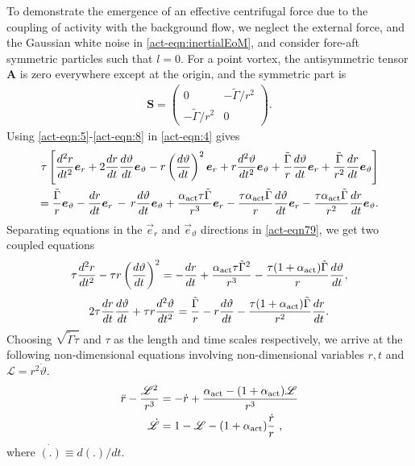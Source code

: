 \documentclass[../Rajarshi-thesis-draft.tex]{subfiles}
\begin{document}
To demonstrate the emergence of an effective centrifugal force due to the coupling of activity with the background flow, we neglect the external force, and the Gaussian white noise in \eqref{act-eqn:inertialEoM}, and consider fore-aft symmetric particles such that $l = 0$. For a point vortex, the antisymmetric tensor $\mathbf{A}$ is zero everywhere except at the origin, and the symmetric part is
\begin{align}
\mathbf{S} = \left(\begin{array}{cc} 0 & -\tilde{\Gamma}/r^{2}\\ -\tilde{\Gamma}/r^{2} & 0 \end{array}\right).
\label{act-eqn:8}
\end{align}
Using \eqref{act-eqn:5}-\eqref{act-eqn:8} in \eqref{act-eqn:4} gives 
\begin{align}
\tau \left[\frac{d^{2} r}{dt^{2}} \vec{e}_r + 2 \frac{d r}{dt}\frac{d \vartheta}{dt} \vec{e}_\vartheta - r \left(\frac{d \vartheta}{dt}\right)^{2} \vec{e}_r + r\frac{d^{2} \vartheta}{dt^{2}} \vec{e}_\vartheta + \frac{\tilde{\Gamma}}{r} \frac{d \vartheta}{dt} \vec{e}_r + \frac{\tilde{\Gamma}}{r^2} \frac{d r}{dt} \vec{e}_\vartheta \right] & \nonumber \\
= \frac{\tilde{\Gamma}}{r} \vec{e}_\vartheta - \frac{dr}{dt} \vec{e}_r \, - \, r\frac{d\vartheta}{dt} \vec{e}_\vartheta 
  +  \frac{\alpha_{\rm act} \tau \tilde{\Gamma}}{r^{3}}  \vec{e}_r - \frac{\tau \alpha_{\rm act} \tilde{\Gamma}}{r} \frac{d\vartheta}{dt} \vec{e}_r - \frac{\tau \alpha_{\rm act} \tilde{\Gamma}}{r^{2}} \frac{dr}{dt} \vec{e}_\vartheta.
\label{act-eqn79}
\end{align}
Separating equations in the $\vec{e}_r$ and $\vec{e}_\vartheta$ directions in \eqref{act-eqn79}, we get two coupled equations
\begin{equation}
\label{act-eom}
\tau \frac{d^{2} r}{dt^{2}} - \tau r \left(\frac{d \vartheta}{dt}\right)^{2} = - \frac{dr}{dt} + \frac{\alpha_{\rm act} \tau \tilde{\Gamma}^{2}}{r^{3}} - \frac{\tau (1+\alpha_{\rm act})\tilde{\Gamma}}{r} \frac{d \vartheta}{dt},
\end{equation}
\begin{equation}
2 \tau \frac{d r}{dt}\frac{d \vartheta}{dt} + \tau r\frac{d^{2} \vartheta}{dt^{2}} = \frac{\tilde{\Gamma}}{r} - r\frac{d\vartheta}{dt} - \frac{\tau (1+\alpha_{\rm act}) \tilde{\Gamma}}{r^{2}} \frac{dr}{dt}.
\end{equation}
Choosing $\sqrt{\tilde{\Gamma}\tau}$ and $\tau$ as the length and time scales respectively, we arrive at the following non-dimensional equations involving non-dimensional variables $r,t$ and $\mathscr{L} = r^2 \dot{\vartheta}$.
\begin{align}
\label{act-nd_eom}
    \begin{split}
    \ddot{r} - \frac{\mathscr{L}^2}{r^3} &= -\dot{r} + \frac{\alpha_{\rm act} - (1 +\alpha_{\rm act})\mathscr{L} }{r^3}\\
    \dot{\mathscr{L}} &= 1- \mathscr{L} - (1+\alpha_{\rm act}) \frac{\dot{r}}{r} \ ,
    \end{split}
\end{align}
where $\dot{(.)}\equiv d(.)/dt$.
\end{document}
